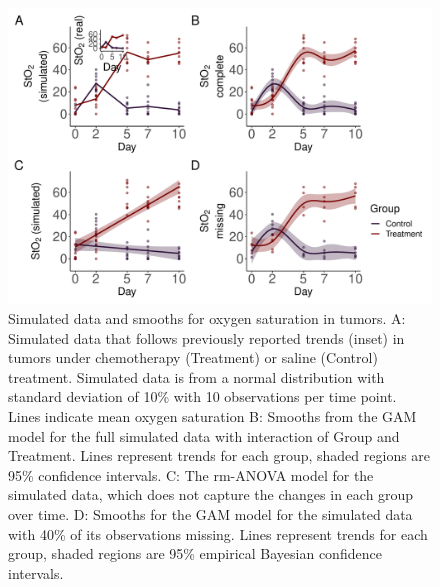 \documentclass[
]{article}
\begin{document}
\begin{figure}

{\centering \includegraphics[width=0.75\linewidth]{Full_document_SIM_No_Appendix_files/figure-latex/sim-smooth-plot-1} 

}

\caption{Simulated data and smooths for oxygen saturation in tumors. A: Simulated data that follows previously reported trends (inset) in tumors under chemotherapy (Treatment) or saline (Control) treatment. Simulated data is from a normal distribution with standard deviation of 10\% with 10 observations per time point. Lines indicate mean oxygen saturation B: Smooths from the GAM model for the full simulated data with interaction of Group and Treatment. Lines represent trends for each group, shaded regions are 95\% confidence intervals. C: The rm-ANOVA model for the simulated data, which does not capture the changes in each group over time. D: Smooths for the GAM model for the simulated data with 40\% of its observations missing. Lines represent trends for each group, shaded regions are 95\% empirical Bayesian confidence intervals.}\label{fig:sim-smooth-plot}
\end{figure}
\end{document}
